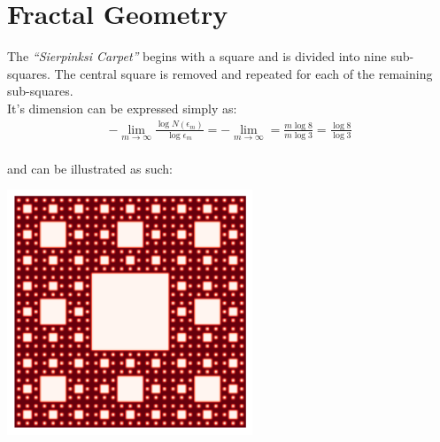 \documentclass{article}
\begin{document}
\section*{Fractal Geometry}
The \textit{``Sierpinksi Carpet''} begins with a square and is divided into nine sub-squares. The central square is removed and repeated for each of the remaining sub-squares.\\


It's dimension can be expressed simply as:
    \begin{equation}
    \begin{split}
        - \lim\limits_{m \to \infty} \frac{\log N(\epsilon_m)}{\log \epsilon_m} = - \lim\limits_{m \to \infty} = \frac{m \log 8}{m \log 3} = \frac{\log 8}{\log 3}
    \end{split}
    \end{equation}\\

and can be illustrated as such:

    \begin{center}
        \includegraphics[width=0.55\textwidth]{carpet.png}
    \end{center}


\newpage



\newpage
\end{document}

